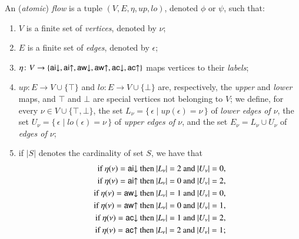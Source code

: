 \newcommand{\ppl  }{{\mathchoice{\scriptstyle+}
                                {\scriptstyle+}
                                {\scriptstyle+}
                                {\scriptscriptstyle+}}}
\newcommand{\pmi  }{{\mathchoice{\scriptstyle-}
                                {\scriptstyle-}
                                {\scriptstyle-}
                                {\scriptscriptstyle-}}}
\newcommand{\card}[1]{\mathord\vert #1\mathord\vert}
\newcommand{\up}{{\mathit up}}
\newcommand{\lo}{{\mathit lo}}
\begin{definition}\label{definition:AtomicFlow}
An (\emph{atomic}) \emph{flow} is a tuple $(V,E,\eta,\up,\lo)$, denoted $\phi$ or $\psi$, such that:
\begin{enumerate}
\item $V$ is a finite set of \emph{vertices}, denoted by $\nu$;
\item $E$ is a finite set of \emph{edges}, denoted by $\epsilon$;
\item $\eta\colon V\to\{\mathsf{ai}{\downarrow},\mathsf{ai}{\uparrow},\mathsf{aw}{\downarrow},\mathsf{aw}{\uparrow},\mathsf{ac}{\downarrow},\mathsf{ac}{\uparrow}\}$ maps vertices to their \emph{labels};
\item $\up\colon E\to V\cup\{\top\}$ and $\lo\colon E\to V\cup\{\bot\}$ are, respectively, the \emph{upper} and \emph{lower} maps, and $\top$ and $\bot$ are special vertices not belonging to $V$; we define, for every $\nu\in V\cup\{\top,\bot\}$, the set $L_\nu=\{\,\epsilon\mid\up(\epsilon)=\nu\,\}$ of \emph{lower edges of $\nu$}, the set $U_\nu=\{\,\epsilon\mid\lo(\epsilon)=\nu\,\}$ of \emph{upper edges of $\nu$}, and the set $E_\nu=L_\nu\cup U_\nu$ of \emph{edges of $\nu$};
\item if $\card S$ denotes the cardinality of set $S$, we have that
\begin{align*}
\mbox{if $\eta(\nu)=\aid$ then $\card{L_\nu}=2$ and $\card{U_\nu}=0$,}&\\
\mbox{if $\eta(\nu)=\aiu$ then $\card{L_\nu}=0$ and $\card{U_\nu}=2$,}&\\
\mbox{if $\eta(\nu)=\awd$ then $\card{L_\nu}=1$ and $\card{U_\nu}=0$,}&\\
\mbox{if $\eta(\nu)=\awu$ then $\card{L_\nu}=0$ and $\card{U_\nu}=1$,}&\\
\mbox{if $\eta(\nu)=\acd$ then $\card{L_\nu}=1$ and $\card{U_\nu}=2$,}&\\
\mbox{if $\eta(\nu)=\acu$ then $\card{L_\nu}=2$ and $\card{U_\nu}=1$;}&
\end{align*}

\end{enumerate}
\end{definition}

